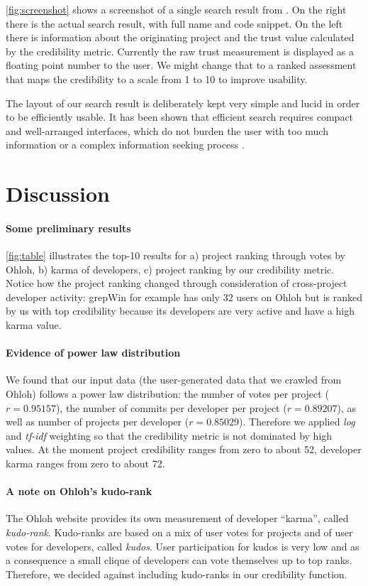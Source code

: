 \autoref{fig:screenshot} shows a screenshot of a single search result from \Jbd. On the right there is the actual search result, with full name and code snippet. On the left there is information about the originating project and the trust value calculated by the credibility metric. Currently the raw trust measurement is displayed as a floating point number to the user. We might change that to a ranked assessment that maps the credibility to a scale from 1 to 10 to improve usability. 

The layout of our search result is deliberately kept very simple and lucid in order to be efficiently usable. It has been shown that efficient search requires compact and well-arranged interfaces, which do not burden the user with too much information or a complex information seeking process \cite{Hear09a}. 


\section{Discussion}
\label{sec:discussion}

\paragraph{Some preliminary results}
\autoref{fig:table} illustrates the top-10 results for a) project ranking through votes by Ohloh, b) karma of developers, c) project ranking by our credibility metric. Notice how the project ranking changed through consideration of cross-project developer activity: grepWin for example has only 32 users on Ohloh but is ranked by us with top credibility because its developers are very active and have a high karma value.

\paragraph{Evidence of power law distribution} 
We found that our input data (\ie the user-generated data that we crawled from Ohloh) follows a power law distribution: the number of votes per project ($r = 0.95157$), the number of commits per developer per project ($r = 0.89207$), as well as number of projects per developer ($r = 0.85029$). Therefore we applied \emph{log} and \emph{tf-idf} weighting so that the credibility metric is not dominated by high values.
At the moment project credibility ranges from zero to about 52, developer karma ranges from zero to about 72.

\paragraph{A note on Ohloh's kudo-rank}
The Ohloh website provides its own measurement of developer ``karma'', called \emph{kudo-rank}. Kudo-ranks are based on a mix of user votes for projects and of user votes for developers, called \emph{kudos}. User participation for kudos is very low and as a consequence a small clique of developers can vote themselves up to top ranks. Therefore, we decided against including kudo-ranks in our credibility function.

